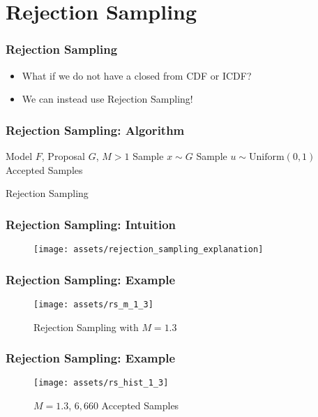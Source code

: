 \documentclass{beamer}
\begin{document}

\section{Rejection Sampling}
\begin{frame}
  \frametitle{Rejection Sampling}
  \begin{itemize}
    \item What if we do not have a closed from CDF or ICDF?
    \item We can instead use Rejection Sampling!
  \end{itemize}
\end{frame}


\begin{frame}
\frametitle{Rejection Sampling: Algorithm}
\begin{algorithm}[H]
\begin{algorithmic}[1]
  \REQUIRE Model $F$, Proposal $G$, $M > 1$
  \STATE Sample $x \sim G$
  \STATE Sample $u \sim \text{Uniform}(0, 1)$
  \ELSE
  \ENDIF
  \ENSURE Accepted Samples
\end{algorithmic}
\caption{Rejection Sampling}
\end{algorithm}
\end{frame}

\begin{frame}
  \frametitle{Rejection Sampling: Intuition}
  \begin{figure}
    \centering
    \texttt{[image: assets/rejection\_sampling\_explanation]}
  \end{figure}
\end{frame}


\begin{frame}
  \frametitle{Rejection Sampling: Example}
  \begin{figure}
    \centering
    \texttt{[image: assets/rs\_m\_1\_3]}
    \caption{Rejection Sampling with $M = 1.3$}
  \end{figure}
\end{frame}

\begin{frame}
  \frametitle{Rejection Sampling: Example}
  \begin{figure}
    \centering
    \texttt{[image: assets/rs\_hist\_1\_3]}
    \caption{$M = 1.3$, $6,660$ Accepted Samples}
  \end{figure}
\end{frame}
\end{document}
